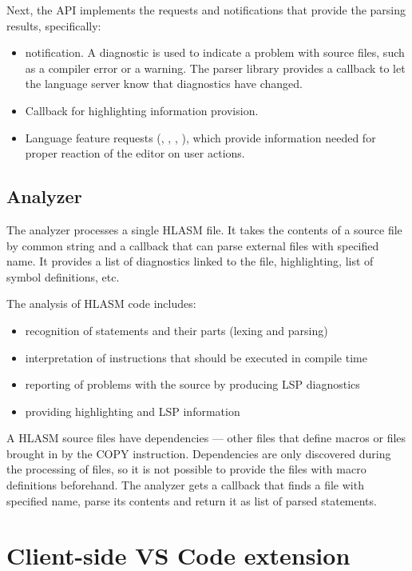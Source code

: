 Next, the API implements the requests and notifications that provide the parsing results, specifically:
\begin{itemize}
	\item {} notification. A diagnostic is used to indicate a problem with source files, such as a compiler error or a warning. The parser library provides a callback to let the language server know that diagnostics have changed.
	\item Callback for highlighting information provision.
	\item Language feature requests (, , , ), which provide information needed for proper reaction of the editor on user actions.
\end{itemize}

\subsection{Analyzer}

The analyzer processes a single HLASM file. It takes the contents of a source file by common string and a callback that can parse external files with specified name. It provides a list of diagnostics linked to the file, highlighting, list of symbol definitions, etc.

The analysis of HLASM code includes:
\begin{itemize}
 \item recognition of statements and their parts (lexing and parsing)
 \item interpretation of instructions that should be executed in compile time
 \item reporting of problems with the source by producing LSP diagnostics
 \item providing highlighting and LSP information
\end{itemize}

A HLASM source files have dependencies --- other files that define macros or files brought in by the COPY instruction. Dependencies are only discovered during the processing of files, so it is not possible to provide the files with macro definitions beforehand. The analyzer gets a callback that finds a file with specified name, parse its contents and return it as list of parsed statements. 

\section{Client-side VS Code extension}
\label{arch:client}

